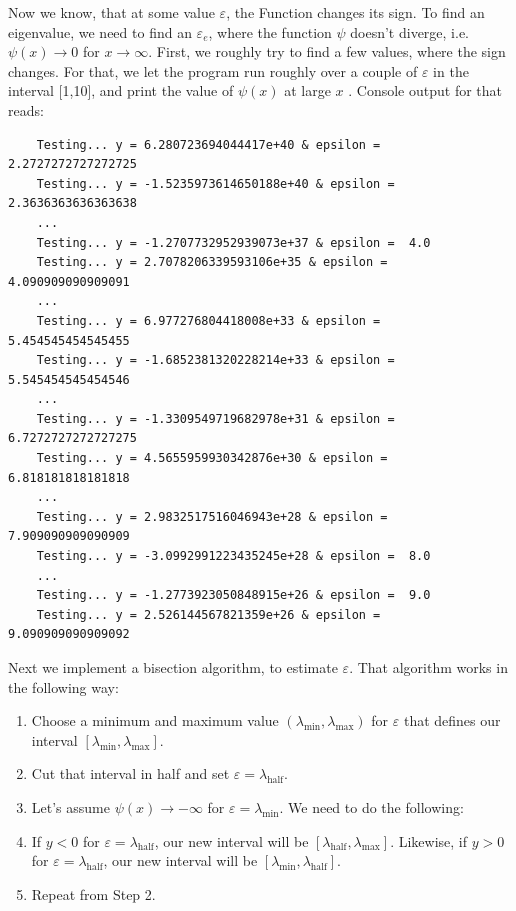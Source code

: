 \documentclass{article}
\begin{document}
Now we know, that at some value \( \varepsilon \), the Function changes its
sign. To find an eigenvalue, we need to find an \( \varepsilon_e \), where the
function \( \psi \) doesn't diverge, i.e. \( \psi (x) \rightarrow 0 \) for 
\( x \rightarrow \infty \). First, we roughly try to find a few values, where
the sign changes. For that, we let the program run roughly over a couple
of \( \varepsilon \) in the interval [1,10], and print the value of \( \psi (x)
\) at large \( x \) . Console output for that reads:

\begin{lstlisting}
    Testing... y = 6.280723694044417e+40 & epsilon =  2.2727272727272725
    Testing... y = -1.5235973614650188e+40 & epsilon =  2.3636363636363638
    ...
    Testing... y = -1.2707732952939073e+37 & epsilon =  4.0
    Testing... y = 2.7078206339593106e+35 & epsilon =  4.090909090909091
    ...
    Testing... y = 6.977276804418008e+33 & epsilon =  5.454545454545455
    Testing... y = -1.6852381320228214e+33 & epsilon =  5.545454545454546
    ...
    Testing... y = -1.3309549719682978e+31 & epsilon =  6.7272727272727275
    Testing... y = 4.5655959930342876e+30 & epsilon =  6.818181818181818
    ...
    Testing... y = 2.9832517516046943e+28 & epsilon =  7.909090909090909
    Testing... y = -3.0992991223435245e+28 & epsilon =  8.0
    ...
    Testing... y = -1.2773923050848915e+26 & epsilon =  9.0
    Testing... y = 2.526144567821359e+26 & epsilon =  9.090909090909092
\end{lstlisting}

Next we implement a bisection algorithm, to estimate \( \varepsilon \).
That algorithm works in the following way:
\begin{enumerate}
    \item Choose a minimum and maximum value \( ( \lambda_\text{min} ,
	    \lambda_\text{max} )\) for \( \varepsilon \)  that
	defines our interval \( [ \lambda_\text{min} ,
	    \lambda_\text{max} ] \).
    \item Cut that interval in half and set 
	\( \varepsilon = \lambda_\text{half} \).
    \item Let's assume \( \psi(x) \rightarrow - \infty \) for \( \varepsilon = 
	    \lambda_\text{min}\). We need to do the following:
    \item If \( y < 0 \) for \( \varepsilon = \lambda_\text{half} \), our new
	interval will be \( [\lambda_\text{half} , \lambda_\text{max}] \).
	Likewise, if \( y > 0 \) for \( \varepsilon = \lambda_\text{half} \),
	our new interval will be \( [\lambda_\text{min} , \lambda_\text{half}]
	\).
    \item Repeat from Step 2.
\end{enumerate}
\end{document}

